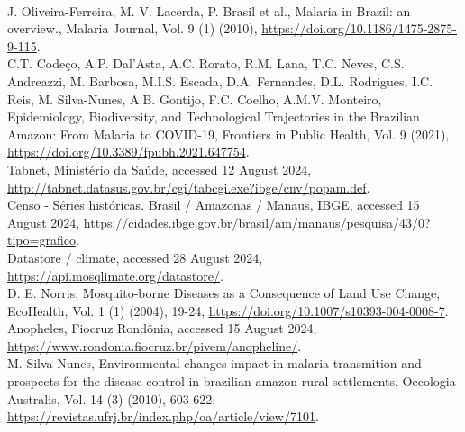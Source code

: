 \documentclass[a4paper,fleqn]{cas-dc}
\begin{document}
\begin{thebibliography}{00}
\\
 J. Oliveira-Ferreira, M. V. Lacerda, P. Brasil et al., Malaria in Brazil: an overview., Malaria Journal, Vol. 9 (1) (2010), \href{https://doi.org/10.1186/1475-2875-9-115}{https://doi.org/10.1186/1475-2875-9-115}.
\\
 C.T. Codeço, A.P. Dal'Asta, A.C. Rorato, R.M. Lana, T.C. Neves, C.S. Andreazzi, M. Barbosa, M.I.S. Escada, D.A. Fernandes, D.L. Rodrigues, I.C. Reis, M. Silva-Nunes, A.B. Gontijo, F.C. Coelho, A.M.V. Monteiro, Epidemiology, Biodiversity, and Technological Trajectories in the Brazilian Amazon: From Malaria to COVID-19, Frontiers in Public Health, Vol. 9 (2021), \href{https://doi.org/10.3389/fpubh.2021.647754}{https://doi.org/10.3389/fpubh.2021.647754}.
\\
 Tabnet, Ministério da Saúde, accessed 12 August 2024, \href{http://tabnet.datasus.gov.br/cgi/tabcgi.exe?ibge/cnv/popam.def}{http://tabnet.datasus.gov.br/cgi/tabcgi.exe?ibge/cnv/popam.def}.
\\
 Censo - Séries históricas. Brasil / Amazonas / Manaus, IBGE, accessed 15 August 2024, \href{https://cidades.ibge.gov.br/brasil/am/manaus/pesquisa/43/0?tipo=grafico}{https://cidades.ibge.gov.br/brasil/am/manaus/pesquisa/43/0?tipo=grafico}.
\\
 Datastore / climate, accessed 28 August 2024, \href{https://api.mosqlimate.org/datastore/}{https://api.mosqlimate.org/datastore/}.
\\
 D. E. Norris, Mosquito-borne Diseases as a Consequence of Land Use Change, EcoHealth, Vol. 1 (1) (2004), 19-24, \href{https://doi.org/10.1007/s10393-004-0008-7}{https://doi.org/10.1007/s10393-004-0008-7}.
\\
 Anopheles, Fiocruz Rondônia, accessed 15 August 2024, \href{https://www.rondonia.fiocruz.br/pivem/anopheline/}{https://www.rondonia.fiocruz.br/pivem/anopheline/}.
\\
 M. Silva-Nunes, Environmental changes impact in malaria transmition and prospects for the disease control in brazilian amazon rural settlements, Oecologia Australis, Vol. 14 (3) (2010), 603-622, \href{https://revistas.ufrj.br/index.php/oa/article/view/7101}{https://revistas.ufrj.br/index.php/oa/article/view/7101}.
\\
\end{thebibliography}
\end{document}

